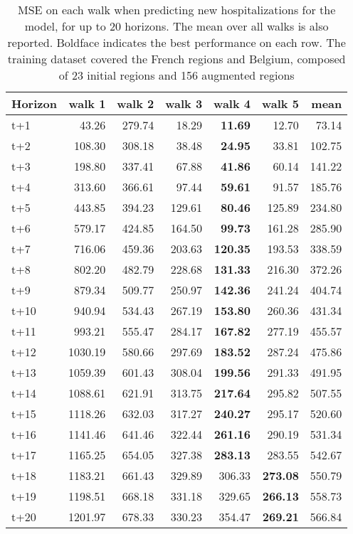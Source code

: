 \begin{table}[H]
\centering
\caption{MSE on each walk when predicting new hospitalizations for the model, for up to 20 horizons. The mean over all walks is also reported. Boldface indicates the best performance on each row. The training dataset covered the French regions and Belgium, composed of 23 initial regions and 156 augmented regions }
\label{tab:MSE_walk_baseline}
\begin{tabular}{lrrrrrr}
\toprule
Horizon &  walk 1 &  walk 2 &  walk 3 &  walk 4 &  walk 5 &   mean \\
\midrule
t+1  & 43.26  & 279.74  & 18.29  & \textbf{11.69}  & 12.70  & 73.14  \\
t+2  & 108.30  & 308.18  & 38.48  & \textbf{24.95}  & 33.81  & 102.75  \\
t+3  & 198.80  & 337.41  & 67.88  & \textbf{41.86}  & 60.14  & 141.22  \\
t+4  & 313.60  & 366.61  & 97.44  & \textbf{59.61}  & 91.57  & 185.76  \\
t+5  & 443.85  & 394.23  & 129.61  & \textbf{80.46}  & 125.89  & 234.80  \\
t+6  & 579.17  & 424.85  & 164.50  & \textbf{99.73}  & 161.28  & 285.90  \\
t+7  & 716.06  & 459.36  & 203.63  & \textbf{120.35}  & 193.53  & 338.59  \\
t+8  & 802.20  & 482.79  & 228.68  & \textbf{131.33}  & 216.30  & 372.26  \\
t+9  & 879.34  & 509.77  & 250.97  & \textbf{142.36}  & 241.24  & 404.74  \\
t+10  & 940.94  & 534.43  & 267.19  & \textbf{153.80}  & 260.36  & 431.34  \\
t+11  & 993.21  & 555.47  & 284.17  & \textbf{167.82}  & 277.19  & 455.57  \\
t+12  & 1030.19  & 580.66  & 297.69  & \textbf{183.52}  & 287.24  & 475.86  \\
t+13  & 1059.39  & 601.43  & 308.04  & \textbf{199.56}  & 291.33  & 491.95  \\
t+14  & 1088.61  & 621.91  & 313.75  & \textbf{217.64}  & 295.82  & 507.55  \\
t+15  & 1118.26  & 632.03  & 317.27  & \textbf{240.27}  & 295.17  & 520.60  \\
t+16  & 1141.46  & 641.46  & 322.44  & \textbf{261.16}  & 290.19  & 531.34  \\
t+17  & 1165.25  & 654.05  & 327.38  & \textbf{283.13}  & 283.55  & 542.67  \\
t+18  & 1183.21  & 661.43  & 329.89  & 306.33  & \textbf{273.08}  & 550.79  \\
t+19  & 1198.51  & 668.18  & 331.18  & 329.65  & \textbf{266.13}  & 558.73  \\
t+20  & 1201.97  & 678.33  & 330.23  & 354.47  & \textbf{269.21}  & 566.84  \\

\bottomrule
\end{tabular}
\end{table}
